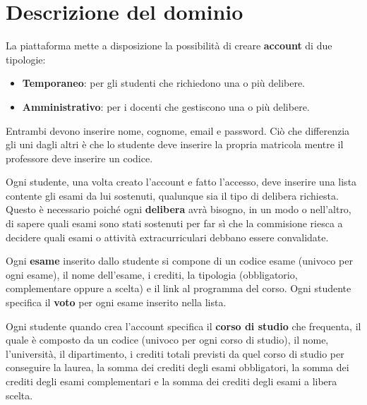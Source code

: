 \section{Descrizione del dominio}
La piattaforma mette a disposizione la possibilità di creare
\textbf{account} di due tipologie:
\begin{itemize}
	\item \textbf{Temporaneo}: per gli studenti che richiedono
	      una o più delibere.
	\item \textbf{Amministrativo}: per i docenti che gestiscono
	      una o più delibere.
\end{itemize}
Entrambi devono inserire nome, cognome, email e password. Ciò
che differenzia gli uni dagli altri è che lo studente deve
inserire la propria matricola mentre il professore deve inserire
un codice.

Ogni studente, una volta creato l'account e fatto l'accesso,
deve inserire una lista contente gli esami da lui sostenuti,
qualunque sia il tipo di delibera richiesta. Questo è necessario
poiché ogni \textbf{delibera} avrà bisogno, in un modo o
nell'altro, di sapere quali esami sono stati sostenuti per far
sì che la commisione riesca a decidere quali esami o attività
extracurriculari debbano essere convalidate.

Ogni \textbf{esame} inserito dallo studente si compone di un
codice esame (univoco per ogni esame), il nome dell'esame, i
crediti, la tipologia (obbligatorio, complementare oppure a
scelta) e il link al programma del corso. Ogni studente
specifica il \textbf{voto} per ogni esame inserito nella lista.

Ogni studente quando crea l'account specifica il
\textbf{corso di studio} che frequenta, il quale è composto da
un codice (univoco per ogni corso di studio), il nome,
l'università, il dipartimento, i crediti totali previsti da
quel corso di studio per conseguire la laurea, la somma dei
crediti degli esami obbligatori, la somma dei crediti degli
esami complementari e la somma dei crediti degli esami a libera
scelta.

